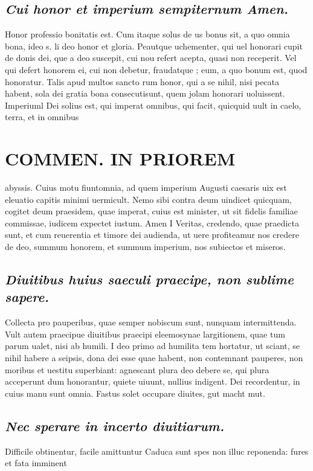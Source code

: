 \documentclass{article}
\begin{document}
\begin{pages}
\subsection*{\textit{Cui honor et imperium sempiternum Amen. }}\pstart Honor professio bonitatis est. Cum itaque solus de us bonus sit, a quo omnia bona, ideo s. li deo honor et gloria. Peautque uchementer, qui uel honorari cupit de donis dei, que a deo suscepit, cui nou refert acepta, quasi non receperit. Vel qui defert honorem ei, cui non debetur, fraudatque ; eum, a quo bonum est, quod honoratur. Talis apud multos sancto rum honor, qui a se nihil, nisi pecata habent, sola dei gratia bona consecutisunt, quem jolam honorari uoluissent.  \pend\pstart Imperiuml Dei solius est, qui imperat omnibus, qui facit, quicquid uult in caelo, terra, et in omnibus  \pend
\section*{COMMEN. IN PRIOREM }
\marginpar{[ p.180 ]}\pstart abyssis. Cuius motu fiuntomnia, ad quem imperium Augusti caesaris uix est eleuatio capitis minimi uermicult. Nemo sibi contra deum uindicet quicquam, cogitet deum praesidem, quae imperat, cuius est minister, ut sit fidelis familiae commissae, iudicem expectet iustum.  \pend\pstart Amen I Veritas, credendo, quae praedicta sunt, et cum reuerentia et timore dei audienda, ut uere profiteamur nos credere de deo, summum honorem, et summum imperium, nos subiectos et miseros.  \pend
{}
{}
\subsection*{\textit{Diuitibus huius saeculi praecipe, non sublime sapere. }}\pstart Collecta pro pauperibus, quae semper nobiscum sunt, nunquam intermittenda. Vult autem praecipue diuitibus praecipi eleemosynae largitionem, quae tum parum ualet, nisi ab humili. I deo primo ad humilita tem hortatur, ut sciant, se nihil habere a seipsis, dona dei esse quae habent, non contemnant pauperes, non moribus et uestitu superbiant: agnescant plura deo debere se, qui plura acceperunt dum honorantur, quiete uiuunt, nullius indigent. Dei recordentur, in cuius manu sunt omnia. Fastus solet occupare diuites, gut macht mut.  \pend
{}
{}
\subsection*{\textit{Nec sperare in incerto diuitiarum. }}\pstart Difficile obtinentur, facile amittuntur Caduca sunt spes non illuc reponenda: fures et fata imminent  \pend

\end{pages}
\end{document}
